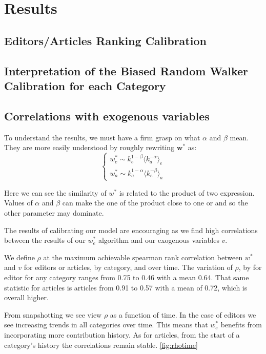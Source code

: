 \section{Results}

\subsection{Editors/Articles Ranking Calibration}

\subsection{Interpretation of the Biased Random Walker Calibration for each Category}


\subsection{Correlations with exogenous variables}

To understand the results, we must have a firm grasp on what $\alpha$ and $\beta$ mean. They are more easily understood by roughly rewriting $\mathbf{w^*}$ as:
\begin{equation}
\begin{cases}
w^{*}_{e} \sim k^{1-\beta}_{e} \langle k_{a}^{-\alpha}\rangle_e \\

w^{*}_{a} \sim k^{1-\alpha}_{a} \langle k_{e}^{-\beta}\rangle_a
\end{cases} \label{eqsim}
\end{equation}

Here we can see the similarity of $w^*$ is related to the product of two expression. Values of $\alpha$ and $\beta$ can make the one of the product close to one or and so the other parameter may dominate.

The results of calibrating our model are encouraging as we find high correlations between the results of our $w^*_e$ algorithm and our exogenous variables $v$. 

We define $\rho$ at the maximum achievable spearman rank correlation between $w^*$ and $v$ for editors or articles, by category, and over time. The variation of $\rho$, by for editor for any category ranges from 0.75 to 0.46 with a mean 0.64.  That same statistic for articles is articles from 0.91 to 0.57 with a mean of 0.72, which is overall higher.

 
From snapshotting we see view $\rho$ as  a function of time. In the case of editors we see increasing trends in all categories over time. This means that $w^*_e$ benefits from incorporating more contribution history. As for articles, from the start of a category's history the correlations remain stable. \ref{fig:rhotime}

